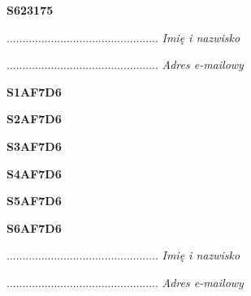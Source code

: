 \begin{turn}{90}\huge \textbf{S623175}\end{turn}

\begin{turn}{90}\begin{minipage}{\linewidth} \vspace{20mm} ................................................  \textit{Imię i nazwisko}\end{minipage}\end{turn}

\begin{turn}{90}\begin{minipage}{\linewidth} \vspace{20mm} ................................................  \textit{Adres e-mailowy}\end{minipage}\end{turn}

\begin{turn}{90}\huge \textbf{S1AF7D6}\end{turn}

\begin{turn}{90}\huge \textbf{S2AF7D6}\end{turn}

\begin{turn}{90}\huge \textbf{S3AF7D6}\end{turn}

\begin{turn}{90}\huge \textbf{S4AF7D6}\end{turn}

\begin{turn}{90}\huge \textbf{S5AF7D6}\end{turn}

\begin{turn}{90}\huge \textbf{S6AF7D6}\end{turn}

\begin{turn}{90}\begin{minipage}{\linewidth} \vspace{20mm} ................................................  \textit{Imię i nazwisko}\end{minipage}\end{turn}

\begin{turn}{90}\begin{minipage}{\linewidth} \vspace{20mm} ................................................  \textit{Adres e-mailowy}\end{minipage}\end{turn}

